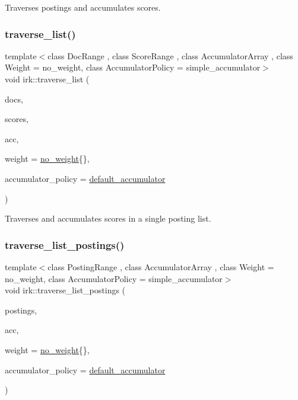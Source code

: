 Traverses postings and accumulates scores. 

\mbox{\label{namespaceirk_a02334cad2fa8f38feab94fe6c1c57d8e}} 
\subsubsection{\texorpdfstring{traverse\+\_\+list()}{traverse\_list()}}
{\footnotesize\ttfamily template$<$class Doc\+Range , class Score\+Range , class Accumulator\+Array , class Weight  = no\+\_\+weight, class Accumulator\+Policy  = simple\+\_\+accumulator$>$ \\
void irk\+::traverse\+\_\+list (\begin{DoxyParamCaption}\item[{const Doc\+Range \&}]{docs,  }\item[{const Score\+Range \&}]{scores,  }\item[{Accumulator\+Array \&}]{acc,  }\item[{Weight}]{weight = {\ttfamily \mbox{\hyperlink{structirk_1_1no__weight}{no\+\_\+weight}}\{\}},  }\item[{Accumulator\+Policy \&}]{accumulator\+\_\+policy = {\ttfamily \mbox{\hyperlink{namespaceirk_ab2909e62b829f7926f8d47d3146d9939}{default\+\_\+accumulator}}} }\end{DoxyParamCaption})}



Traverses and accumulates scores in a single posting list. 

\mbox{\label{namespaceirk_aa97b41a8c849bf1c0710f5297997a6c4}} 
\subsubsection{\texorpdfstring{traverse\+\_\+list\+\_\+postings()}{traverse\_list\_postings()}}
{\footnotesize\ttfamily template$<$class Posting\+Range , class Accumulator\+Array , class Weight  = no\+\_\+weight, class Accumulator\+Policy  = simple\+\_\+accumulator$>$ \\
void irk\+::traverse\+\_\+list\+\_\+postings (\begin{DoxyParamCaption}\item[{const Posting\+Range \&}]{postings,  }\item[{Accumulator\+Array \&}]{acc,  }\item[{Weight}]{weight = {\ttfamily \mbox{\hyperlink{structirk_1_1no__weight}{no\+\_\+weight}}\{\}},  }\item[{Accumulator\+Policy}]{accumulator\+\_\+policy = {\ttfamily \mbox{\hyperlink{namespaceirk_ab2909e62b829f7926f8d47d3146d9939}{default\+\_\+accumulator}}} }\end{DoxyParamCaption})}




